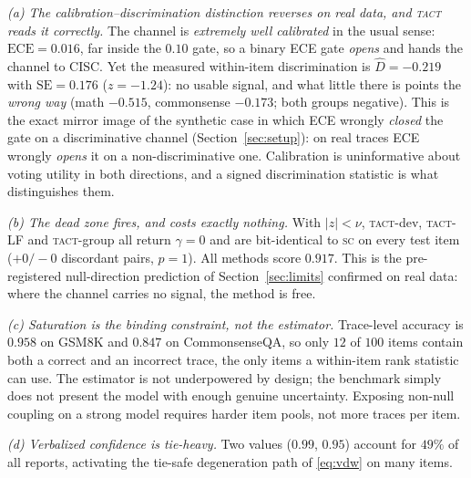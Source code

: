 \documentclass[twoside,11pt]{article}
\newcommand{\Dhat}{\widehat{D}}
\newcommand{\SC}{\textsc{sc}}
\newcommand{\TACT}{\textsc{tact}}
\begin{document}
\emph{(a) The calibration--discrimination distinction reverses on real data,
and \TACT{} reads it correctly.} The channel is \emph{extremely well calibrated}
in the usual sense: $\mathrm{ECE}=0.016$, far inside the $0.10$ gate, so a
binary ECE gate \emph{opens} and hands the channel to CISC. Yet the measured
within-item discrimination is $\Dhat=-0.219$ with $\mathrm{SE}=0.176$
($z=-1.24$): no usable signal, and what little there is points the
\emph{wrong way} (math $-0.515$, commonsense $-0.173$; both groups negative).
This is the exact mirror image of the synthetic case in which ECE wrongly
\emph{closed} the gate on a discriminative channel (Section~\ref{sec:setup}):
on real traces ECE wrongly \emph{opens} it on a non-discriminative one.
Calibration is uninformative about voting utility in both directions, and a
signed discrimination statistic is what distinguishes them.

\emph{(b) The dead zone fires, and costs exactly nothing.} With $|z|<\nu$,
\TACT-dev, \TACT-LF and \TACT-group all return $\gamma=0$ and are bit-identical
to \SC{} on every test item ($+0/-0$ discordant pairs, $p=1$). All methods score
$0.917$. This is the pre-registered null-direction prediction of
Section~\ref{sec:limits} confirmed on real data: where the channel carries no
signal, the method is free.

\emph{(c) Saturation is the binding constraint, not the estimator.} Trace-level
accuracy is $0.958$ on GSM8K and $0.847$ on CommonsenseQA, so only $12$ of $100$
items contain both a correct and an incorrect trace, the only items a
within-item rank statistic can use. The estimator is not underpowered by
design; the benchmark simply does not present the model with enough genuine
uncertainty. Exposing non-null coupling on a strong model requires harder item
pools, not more traces per item.

\emph{(d) Verbalized confidence is tie-heavy.} Two values ($0.99$, $0.95$)
account for $49\%$ of all reports, activating the tie-safe degeneration path of
\eqref{eq:vdw} on many items.
\end{document}
